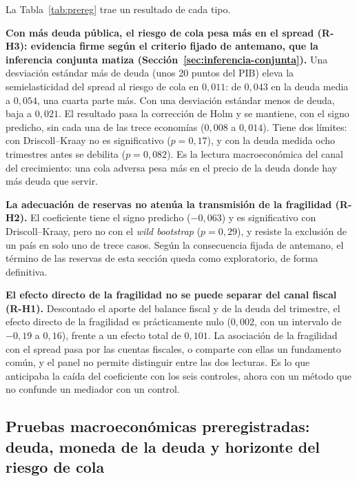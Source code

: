 La Tabla~\ref{tab:prereg} trae un resultado de cada tipo.

\textbf{Con más deuda pública, el riesgo de cola pesa más en el spread (R-H3): evidencia firme según el criterio fijado de antemano, que la inferencia conjunta matiza (Sección~\ref{sec:inferencia-conjunta}).} Una desviación estándar más de deuda (unos 20 puntos del PIB) eleva la semielasticidad del spread al riesgo de cola en $0{,}011$: de $0{,}043$ en la deuda media a $0{,}054$, una cuarta parte más. Con una desviación estándar menos de deuda, baja a $0{,}021$. El resultado pasa la corrección de Holm y se mantiene, con el signo predicho, sin cada una de las trece economías ($0{,}008$ a $0{,}014$). Tiene dos límites: con Driscoll--Kraay no es significativo ($p=0{,}17$), y con la deuda medida ocho trimestres antes se debilita ($p=0{,}082$). Es la lectura macroeconómica del canal del crecimiento: una cola adversa pesa más en el precio de la deuda donde hay más deuda que servir.

\textbf{La adecuación de reservas no atenúa la transmisión de la fragilidad (R-H2).} El coeficiente tiene el signo predicho ($-0{,}063$) y es significativo con Driscoll--Kraay, pero no con el \textit{wild bootstrap} ($p=0{,}29$), y resiste la exclusión de un país en solo uno de trece casos. Según la consecuencia fijada de antemano, el término de las reservas de esta sección queda como exploratorio, de forma definitiva.

\textbf{El efecto directo de la fragilidad no se puede separar del canal fiscal (R-H1).} Descontado el aporte del balance fiscal y de la deuda del trimestre, el efecto directo de la fragilidad es prácticamente nulo ($0{,}002$, con un intervalo de $-0{,}19$ a $0{,}16$), frente a un efecto total de $0{,}101$. La asociación de la fragilidad con el spread pasa por las cuentas fiscales, o comparte con ellas un fundamento común, y el panel no permite distinguir entre las dos lecturas. Es lo que anticipaba la caída del coeficiente con los seis controles, ahora con un método que no confunde un mediador con un control.

\subsection{Pruebas macroeconómicas preregistradas: deuda, moneda de la deuda y horizonte del riesgo de cola}
\label{sec:macro-prereg}

